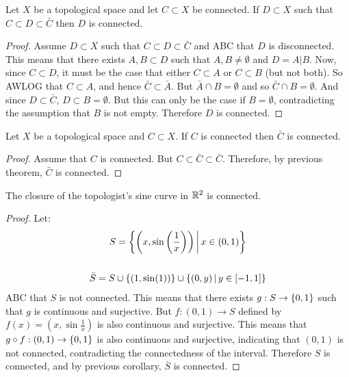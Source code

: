 \documentclass[letterpaper,12pt,fleqn]{article}
\begin{document}
\begin{theorem}
  Let \(X\) be a topological space and let \(C\subset X\) be connected.  If \(D\subset X\) such that
  \(C\subset D\subset\bar{C}\) then \(D\) is connected.
\end{theorem}

\begin{proof}
  Assume \(D\subset X\) such that \(C\subset D\subset\bar{C}\) and ABC that \(D\) is disconnected.  This means that
  there exists \(A,B\subset D\) such that \(A,B\ne\emptyset\) and \(D=A|B\).  Now, since \(C\subset D\), it must be
  the case that either \(C\subset A\) or \(C\subset B\) (but not both).  So AWLOG that \(C\subset A\), and hence
  \(\bar{C}\subset\bar{A}\).  But \(\bar{A}\cap B=\emptyset\) and so \(\bar{C}\cap B=\emptyset\).  And since
  \(D\subset\bar{C}\), \(D\subset B=\emptyset\).  But this can only be the case if \(B=\emptyset\), contradicting
  the assumption that \(B\) is not empty.  Therefore \(D\) is connected.
\end{proof}

\begin{corollary}
  Let \(X\) be a topological space and \(C\subset X\).  If \(C\) is connected then \(\bar{C}\) is connected.
\end{corollary}

\begin{proof}
  Assume that \(C\) is connected.  But \(C\subset\bar{C}\subset\bar{C}\).  Therefore, by previous theorem,
  \(\bar{C}\) is connected.
\end{proof}

\begin{theorem}
  The closure of the topologist's sine curve in \(\mathbb{R}^2\) is connected.
\end{theorem}

\begin{proof}
  Let:
  \begin{gather*}
    S=\left\{{\left(x,\sin\left(\frac{1}{x}\right)\right)}\,\middle|\,{x\in(0,1)}\right\} \\
    \\
    \bar{S}=S\cup\{(1,\sin(1))\}\cup\left\{{(0,y)}\,\middle|\,{y\in[-1,1]}\right\}
  \end{gather*}
  ABC that \(S\) is not connected.  This means that there exists \(g:S\to\{0,1\}\) such that \(g\) is continuous
  and surjective.  But \(f:(0,1)\to S\) defined by \(f(x)=(x,\sin\frac{1}{x})\) is also continuous and surjective.
  This means that \(g\circ f:(0,1)\to\{0,1\}\) is also continuous and surjective, indicating that \((0,1)\)
  is not connected, contradicting the connectedness of the interval.  Therefore \(S\) is connected, and by
  previous corollary, \(\bar{S}\) is connected.
\end{proof}
\end{document}
